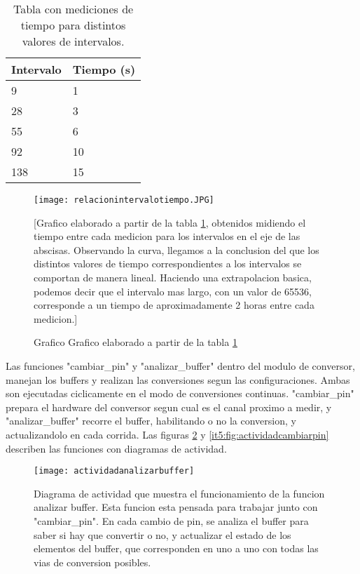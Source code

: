 \begin{table}[h]
\centering
\caption{Tabla con mediciones de tiempo para distintos valores de intervalos.}
\label{it5:tab:tablamediciones}
\begin{tabular}{|l|l|}
\hline
\rowcolor[HTML]{34CDF9} 
Intervalo & Tiempo (s) \\ \hline
\rowcolor[HTML]{CBF3FF} 
9         & 1          \\ \hline
\rowcolor[HTML]{CBF3FF} 
28        & 3          \\ \hline
\rowcolor[HTML]{CBF3FF} 
55        & 6          \\ \hline
\rowcolor[HTML]{CBF3FF} 
92        & 10         \\ \hline
\rowcolor[HTML]{CBF3FF} 
138       & 15         \\ \hline
\end{tabular}
\end{table}

\begin{figure}[h]
  \centering
  \texttt{[image: relacionintervalotiempo.JPG]}
  \caption{Grafico Grafico elaborado a partir de la tabla \ref{it5:tab:tablamediciones}}[Grafico elaborado a partir de la tabla \ref{it5:tab:tablamediciones}, obtenidos midiendo el tiempo entre cada medicion para los intervalos en el eje de las abscisas. Observando la curva, llegamos a la conclusion del que los distintos valores de tiempo correspondientes a los intervalos se comportan de manera lineal. Haciendo una extrapolacion basica, podemos decir que el intervalo mas largo, con un valor de 65536, corresponde a un tiempo de aproximadamente 2 horas entre cada medicion.]\label{it5:fig:relacionintervalotiempo}
\end{figure}

Las funciones "cambiar\_pin" y "analizar\_buffer" dentro del modulo de conversor, manejan los buffers y realizan las conversiones segun las configuraciones. Ambas son ejecutadas ciclicamente en el modo de conversiones continuas. "cambiar\_pin" prepara el hardware del conversor segun cual es el canal proximo a medir, y "analizar\_buffer" recorre el buffer, habilitando o no la conversion, y actualizandolo en cada corrida. Las figuras \ref{it5:fig:actividadanalizarbuffer} y \ref{it5:fig:actividadcambiarpin} describen las funciones con diagramas de actividad.
 
\begin{figure}[h]
  \centering
  \texttt{[image: actividadanalizarbuffer]}
  \caption[Diagrama de actividad de la funcion analizar buffer]{Diagrama de actividad que muestra el funcionamiento de la funcion analizar buffer. Esta funcion esta pensada para trabajar junto con "cambiar\_pin". En cada cambio de pin, se analiza el buffer para saber si hay que convertir o no, y actualizar el estado de los elementos del buffer, que corresponden en uno a uno con todas las vias de conversion posibles.}\label{it5:fig:actividadanalizarbuffer}
\end{figure}



